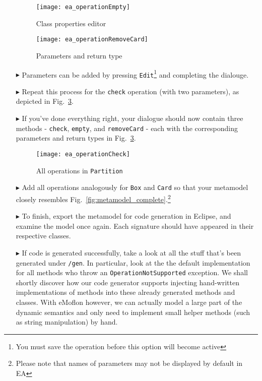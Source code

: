 \begin{enumerate}
\begin{figure}[htbp]
	\centering
  	\texttt{[image: ea\_operationEmpty]}
	\caption{Class properties editor}
	\label{fig:operation_properties}
\end{figure}

\begin{figure}[htbp]
	\centering
  \texttt{[image: ea\_operationRemoveCard]}
	\caption{Parameters and return type}
	\label{fig:operation_parameters}
\end{figure}

\item[$\blacktriangleright$] Parameters can be added by pressing \texttt{Edit}\footnote{You must save the operation before this option will become active} and
completing the dialouge.

\item[$\blacktriangleright$] Repeat this process for the \texttt{check} operation (with two parameters), as depicted in Fig.~\ref{fig:operation_partition}. 

\item[$\blacktriangleright$] If you've done everything right, your dialogue should now contain three methods - \texttt{check}, \texttt{empty}, and
\texttt{removeCard} - each with the corresponding parameters and return types in Fig.~\ref{fig:operation_partition}.

\begin{figure}[htbp]
	\centering
  \texttt{[image: ea\_operationCheck]}
	\caption{All operations in \texttt{Partition}}
	\label{fig:operation_partition}
\end{figure}

\item[$\blacktriangleright$] Add all operations analogously for \texttt{Box} and \texttt{Card} so that your metamodel closely resembles
Fig.~\ref{fig:metamodel_complete}.\footnote{Please note that names of parameters may not be displayed by default in EA}

\item[$\blacktriangleright$] To finish, export the metamodel for code generation in Eclipse, and examine the model once again. Each signature should have
appeared in their respective classes.

\item[$\blacktriangleright$]  If code is generated successfully, take a look at all the stuff that's been generated under \texttt{/gen}. In particular, look at
the the default implementation for all methods who throw an \texttt{OperationNotSupported} exception. We shall shortly discover how our code generator supports
injecting hand-written implementations of methods into these already generated methods and classes. With eMoflon however, we can actually model a large part of
the dynamic semantics and only need to implement small helper methods (such as string manipulation) by hand.


\end{enumerate}
